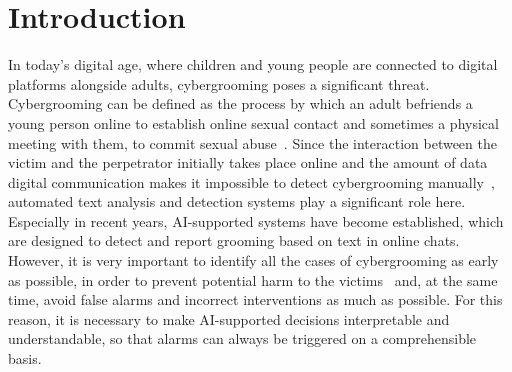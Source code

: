 \chapter{Introduction} 

In today's digital age, where children and young people are connected to digital platforms alongside adults, cybergrooming poses a significant threat. Cybergrooming can be defined as the process by which an adult befriends a young person online to establish online sexual contact and sometimes a physical meeting with them, to commit sexual abuse~\cite{webster2021european}. Since the interaction between the victim and the perpetrator initially takes place online and the amount of data digital communication makes it impossible to detect cybergrooming manually~\cite{hamm2025llms}, automated text analysis and detection systems play a significant role here. Especially in recent years, AI-supported systems have become established, which are designed to detect and report grooming based on text in online chats. However, it is very important to identify all the cases of cybergrooming as early as possible,  in order to prevent potential harm to the victims~\cite{vogt2021early} and, at the same time, avoid false alarms and incorrect interventions as much as possible. For this reason, it is necessary to make AI-supported decisions interpretable and understandable, so that alarms can always be triggered on a comprehensible basis.

